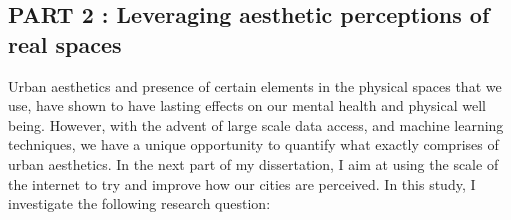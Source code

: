 \subsection{PART 2 : Leveraging aesthetic perceptions of real spaces}
Urban aesthetics and presence of certain elements in the physical spaces that we use, have shown to have lasting effects on our mental health\cite{seresinhe2017using} and physical well being\cite{ball2001perceived,giles2005increasing}. However, with the advent of large scale data access, and machine learning techniques, we have a unique opportunity to quantify what exactly comprises of urban aesthetics.
In the next part of my dissertation, I aim at using the scale of the internet to try and improve how our cities are perceived. In this study, I investigate the following research question: 
\noindent{}

\noindent{}

\noindent{}
\vspace{0.5cm}

